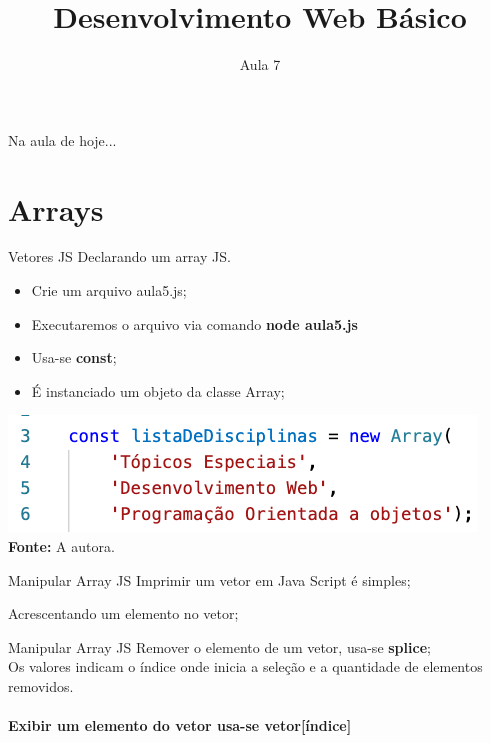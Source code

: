\documentclass{beamer}
\date{}
\title{Desenvolvimento Web Básico}
\subtitle{Aula 7}
\begin{document}
\frame{
 \titlepage
}

\begin{frame}{Na aula de hoje...} 
\tableofcontents 
\end{frame}
\section{Arrays}
\begin{frame}{Vetores JS}
Declarando um array JS.
\begin{itemize}
    \item Crie um arquivo aula5.js;
    \item Executaremos o arquivo via comando \textbf{node aula5.js}
    \item Usa-se \textbf{const};
    \item É instanciado um objeto da classe Array;
\end{itemize}
  \begin{center}
       \includegraphics[height=0.2\paperheight]{fig/aula5/aula_js_5_1.png} \\
       \tiny{\textbf{Fonte: } A autora.}
      \end{center}
\end{frame}
\begin{frame}{Manipular Array JS}
Imprimir um vetor em Java Script é simples;

Acrescentando um elemento no vetor; 

\end{frame}
\begin{frame}{Manipular Array JS}
Remover o elemento de um vetor, usa-se \textbf{splice};
\\
Os valores indicam o índice onde inicia a seleção e a quantidade de elementos removidos.\\
\paragraph{Exibir um elemento do vetor usa-se vetor[índice]}

\cite{wschool2018js}
\end{frame}
\end{document}
